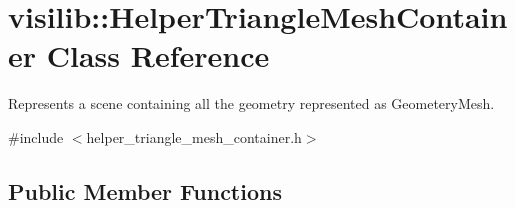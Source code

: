 \hypertarget{classvisilib_1_1_helper_triangle_mesh_container}{}\section{visilib\+::Helper\+Triangle\+Mesh\+Container Class Reference}
\label{classvisilib_1_1_helper_triangle_mesh_container}


Represents a scene containing all the geometry represented as Geometery\+Mesh.  




{\ttfamily \#include $<$helper\+\_\+triangle\+\_\+mesh\+\_\+container.\+h$>$}

\subsection*{Public Member Functions}
